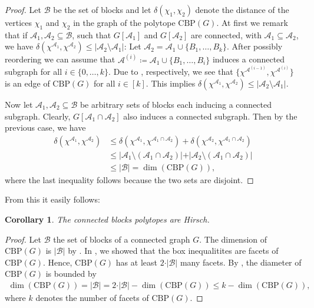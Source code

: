 \documentclass[12pt]{amsart}
\newtheorem{corollary}[theorem]{Corollary}
\newcommand{\CBP}{\mathrm{CBP}}
\newcommand{\B}{\mathcal{B}}
\newcommand{\A}{\mathcal{A}}
\begin{document}
\begin{proof}
    Let $\B$ be the set of blocks and let $\delta(\chi_1,\chi_2)$ denote the distance of the vertices $\chi_1$ and $\chi_2$ in the graph of the polytope $\CBP(G)$. At first we remark that if $\A_1,\A_2 \subseteq \B$, such that $G[\A_1]$ and $G[\A_2]$ are connected, with $\A_1 \subseteq \A_2$, we have $\delta(\chi^{\A_1},\chi^{\A_2}) \le \vert \A_2 \setminus \A_1 \vert$: Let $\A_2=\A_1 \cup \{B_1,\ldots,B_k\}$. After possibly reordering we can assume that $\A^{(i)}\coloneqq \A_1 \cup \{B_1,\ldots,B_i\}$ induces a connected subgraph for all $i \in \{0,\ldots,k\}$. Due to , respectively, we see that $\{\chi^{\A^{(i-1)}},\chi^{\A^{(i)}}\}$ is an edge of $\CBP(G)$ for all $i \in [k]$. This implies $\delta(\chi^{\A_1},\chi^{\A_2})\le \vert \A_2 \setminus \A_1\vert$.
    
    Now let $\A_1,\A_2 \subseteq \B$ be arbitrary sets of blocks each inducing a connected subgraph. Clearly, $G[\A_1 \cap \A_2]$ also induces a connected subgraph. Then by the previous case, we have
    \begin{align*}
        \delta(\chi^{\A_1},\chi^{\A_2}) &\le \delta(\chi^{\A_1},\chi^{\A_1\cap\A_2})+\delta(\chi^{\A_2},\chi^{\A_1\cap\A_2}) \\
                        & \le \vert \A_1 \setminus (\A_1\cap\A_2) \vert + \vert \A_2 \setminus (\A_1\cap\A_2) \vert \\
                        & \le \vert \B \vert=\dim(\CBP(G)),
    \end{align*}
    where the last inequality follows because the two sets are disjoint.
\end{proof}

From this it easily follows:

\begin{corollary}
    The connected blocks polytopes are Hirsch.
\end{corollary}

\begin{proof}
    Let $\B$ the set of blocks of a connected graph $G$. The dimension of $\CBP(G)$ is $\vert \B \vert$ by . In , we showed that the box inequalitites are facets of $\CBP(G)$. Hence, $\CBP(G)$ has at least $2 \cdot \vert \B \vert$ many facets. By , the diameter of $\CBP(G)$ is bounded by
    \begin{align*}
        \dim(\CBP(G))=\vert \B \vert = 2 \cdot \vert \B \vert - \dim(\CBP(G)) \le k-\dim(\CBP(G)),
    \end{align*}
    where $k$ denotes the number of facets of $\CBP(G)$.
\end{proof}
\end{document}
